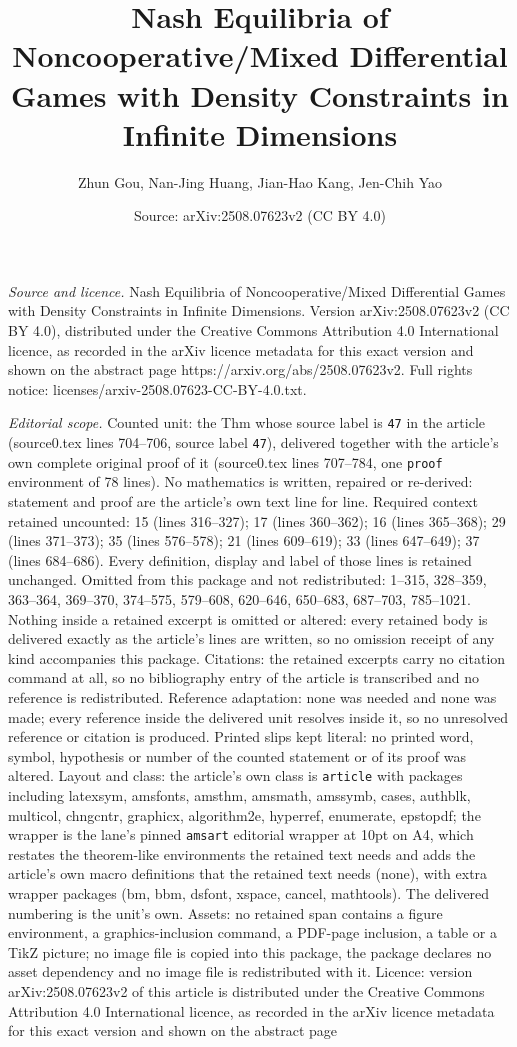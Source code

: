 \documentclass[10pt,a4paper]{amsart}
\title[Nash Equilibria of Noncooperative/Mixed Differential Games w]{Nash Equilibria of Noncooperative/Mixed Differential Games with Density Constraints in Infinite Dimensions}
\author{Zhun Gou, Nan-Jing Huang, Jian-Hao Kang, Jen-Chih Yao}
\date{Source: arXiv:2508.07623v2 (CC BY 4.0)}
\begin{document}
\maketitle

\noindent\emph{Source and licence.} Nash Equilibria of Noncooperative/Mixed Differential Games with Density Constraints in Infinite Dimensions. Version arXiv:2508.07623v2 (CC BY 4.0), distributed under the Creative Commons Attribution 4.0 International licence, as recorded in the arXiv licence metadata for this exact version and shown on the abstract page https://arxiv.org/abs/2508.07623v2. Full rights notice: licenses/arxiv-2508.07623-CC-BY-4.0.txt.\par\smallskip

\noindent\textit{Editorial scope.} Counted unit: the Thm whose source label is \texttt{47} in the article (source0.tex lines 704--706, source label \texttt{47}), delivered together with the article's own complete original proof of it (source0.tex lines 707--784, one \texttt{proof} environment of 78 lines). No mathematics is written, repaired or re-derived: statement and proof are the article's own text line for line. Required context retained uncounted: 15 (lines 316--327); 17 (lines 360--362); 16 (lines 365--368); 29 (lines 371--373); 35 (lines 576--578); 21 (lines 609--619); 33 (lines 647--649); 37 (lines 684--686). Every definition, display and label of those lines is retained unchanged. Omitted from this package and not redistributed: 1--315, 328--359, 363--364, 369--370, 374--575, 579--608, 620--646, 650--683, 687--703, 785--1021. Nothing inside a retained excerpt is omitted or altered: every retained body is delivered exactly as the article's lines are written, so no omission receipt of any kind accompanies this package. Citations: the retained excerpts carry no citation command at all, so no bibliography entry of the article is transcribed and no reference is redistributed. Reference adaptation: none was needed and none was made; every reference inside the delivered unit resolves inside it, so no unresolved reference or citation is produced. Printed slips kept literal: no printed word, symbol, hypothesis or number of the counted statement or of its proof was altered. Layout and class: the article's own class is \texttt{article} with packages including latexsym, amsfonts, amsthm, amsmath, amssymb, cases, authblk, multicol, chngcntr, graphicx, algorithm2e, hyperref, enumerate, epstopdf; the wrapper is the lane's pinned \texttt{amsart} editorial wrapper at 10pt on A4, which restates the theorem-like environments the retained text needs and adds the article's own macro definitions that the retained text needs (none), with extra wrapper packages (bm, bbm, dsfont, xspace, cancel, mathtools). The delivered numbering is the unit's own. Assets: no retained span contains a figure environment, a graphics-inclusion command, a PDF-page inclusion, a table or a TikZ picture; no image file is copied into this package, the package declares no asset dependency and no image file is redistributed with it. Licence: version arXiv:2508.07623v2 of this article is distributed under the Creative Commons Attribution 4.0 International licence, as recorded in the arXiv licence metadata for this exact version and shown on the abstract page 
\end{document}

